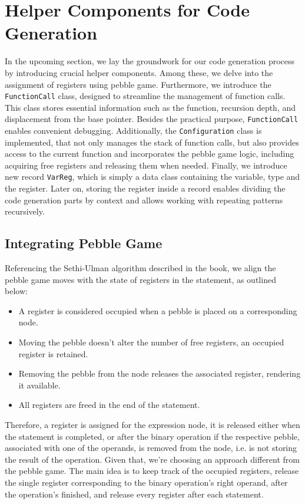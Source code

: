 \section{Helper Components for Code Generation}\label{sec:helpers}
In the upcoming section, we lay the groundwork for our code generation process by introducing crucial
helper components. Among these, we delve into the assignment of registers using pebble game. Furthermore, we
introduce the \verb+FunctionCall+ class, designed to streamline the management of function calls. This class stores
essential information such as the function, recursion depth, and displacement from the base pointer. Besides the practical
purpose, \verb+FunctionCall+ enables convenient debugging. Additionally, the \verb+Configuration+ class is implemented, that
not only manages the stack of function calls, but also provides access to the current function and incorporates the pebble game
logic, including acquiring free registers and releasing them when needed. Finally, we introduce new record \verb+VarReg+, which is
simply a data class containing the variable, type and the register. Later on, storing the register inside a record enables
dividing the code generation parts by context and allows working with repeating patterns recursively.
\subsection{Integrating Pebble Game}
Referencing the Sethi-Ulman algorithm described in the book, we align the pebble game moves with the state of registers in the statement,
as outlined below:
\begin{itemize}
    \item A register is considered occupied when a pebble is placed on a corresponding node.
    \item Moving the pebble doesn't alter the number of free registers, an occupied register is retained.
    \item Removing the pebble from the node releases the associated register, rendering it available.
    \item All registers are freed in the end of the statement.
\end{itemize}
Therefore, a register is assigned for the expression node, it is released either when the statement is completed, or after
the binary operation if the respective pebble, associated with one of the operands, is removed from the node, i.e. is not
storing the result of the operation. Given that, we're choosing an approach different from the pebble game. The main idea is
to keep track of the occupied registers, release the single register corresponding to the binary operation's right operand, after the operation's finished,
and release every register after each statement.
